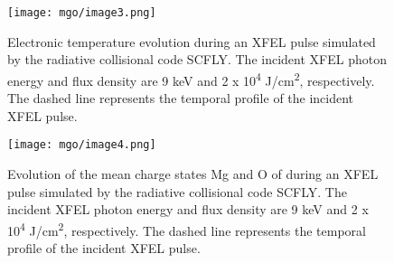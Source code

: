 \begin{figure}[h]
\caption{
Electronic temperature evolution during an XFEL pulse
simulated by the radiative collisional code SCFLY. The incident XFEL
photon energy and flux density are 9 keV and 2 x 10\textsuperscript{4}
J/cm\textsuperscript{2}, respectively. The dashed line represents the
temporal profile of the incident XFEL pulse.
}
\centering
\texttt{[image: mgo/image3.png]}
\end{figure}

\begin{figure}[h]
\caption{
Evolution of the mean charge states Mg and O of during
an XFEL pulse simulated by the radiative collisional code SCFLY. The
incident XFEL photon energy and flux density are 9 keV and 2 x
10\textsuperscript{4} J/cm\textsuperscript{2}, respectively. The dashed
line represents the temporal profile of the incident XFEL pulse.
}
\centering
\texttt{[image: mgo/image4.png]}
\end{figure}
